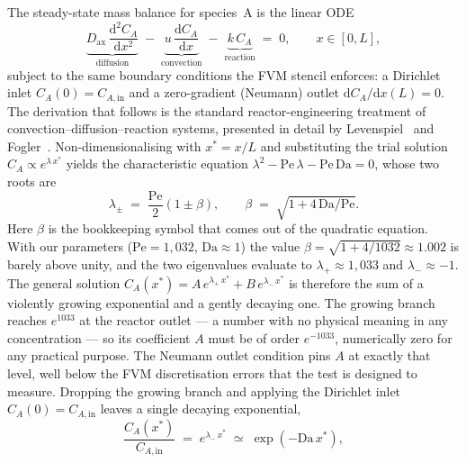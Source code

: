 The steady-state mass balance for species~A is the linear ODE
\begin{equation}
  \underbrace{D_\mathrm{ax}\,\frac{\mathrm{d}^2 C_A}{\mathrm{d}x^2}}_{\text{diffusion}}
  \;-\;
  \underbrace{u\,\frac{\mathrm{d} C_A}{\mathrm{d}x}}_{\text{convection}}
  \;-\;
  \underbrace{k\,C_A}_{\text{reaction}}
  \;=\; 0,
  \qquad x \in [0, L],
  \label{eq:test2_steady_pde}
\end{equation}
subject to the same boundary conditions the FVM stencil enforces: a Dirichlet inlet \(C_A(0) = C_{A,\mathrm{in}}\) and a zero-gradient (Neumann) outlet \(\mathrm{d}C_A/\mathrm{d}x(L) = 0\). The derivation that follows is the standard reactor-engineering treatment of convection--diffusion--reaction systems, presented in detail by Levenspiel~\cite{Levenspiel1999} and Fogler~\cite{Fogler2006}. Non-dimensionalising with \(x^\ast = x/L\) and substituting the trial solution \(C_A \propto e^{\lambda\,x^\ast}\) yields the characteristic equation \(\lambda^2 - \mathrm{Pe}\,\lambda - \mathrm{Pe}\,\mathrm{Da} = 0\), whose two roots are
\begin{equation*}
  \lambda_\pm \;=\; \frac{\mathrm{Pe}}{2}\left(1 \pm \beta\right),
  \qquad
  \beta \;=\; \sqrt{1 + 4\,\mathrm{Da}/\mathrm{Pe}}.
\end{equation*}
Here \(\beta\) is the bookkeeping symbol that comes out of the quadratic equation. With our parameters (\(\mathrm{Pe} = 1{,}032\), \(\mathrm{Da} \approx 1\)) the value \(\beta = \sqrt{1 + 4/1032} \approx 1.002\) is barely above unity, and the two eigenvalues evaluate to \(\lambda_+ \approx 1{,}033\) and \(\lambda_- \approx -1\). The general solution \(C_A(x^\ast) = A\,e^{\lambda_+\,x^\ast} + B\,e^{\lambda_-\,x^\ast}\) is therefore the sum of a violently growing exponential and a gently decaying one. The growing branch reaches \(e^{1033}\) at the reactor outlet --- a number with no physical meaning in any concentration --- so its coefficient \(A\) must be of order \(e^{-1033}\), numerically zero for any practical purpose. The Neumann outlet condition pins \(A\) at exactly that level, well below the FVM discretisation errors that the test is designed to measure. Dropping the growing branch and applying the Dirichlet inlet \(C_A(0) = C_{A,\mathrm{in}}\) leaves a single decaying exponential,
\begin{equation}
  \frac{C_A(x^\ast)}{C_{A,\mathrm{in}}} \;=\; e^{\lambda_-\,x^\ast}
  \;\simeq\; \exp(-\mathrm{Da}\,x^\ast),
  \label{eq:test2_analytical}
\end{equation}
